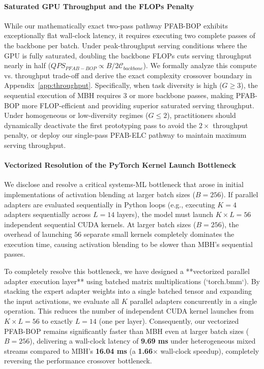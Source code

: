 \paragraph{Saturated GPU Throughput and the FLOPs Penalty}
While our mathematically exact two-pass pathway \textsc{PFAB-BOP} exhibits exceptionally flat wall-clock latency, it requires executing two complete passes of the backbone per batch. Under peak-throughput serving conditions where the GPU is fully saturated, doubling the backbone FLOPs cuts serving throughput nearly in half ($QPS_{PFAB-BOP} \propto B / 2\mathcal{C}_{backbone}$). We formally analyze this compute vs. throughput trade-off and derive the exact complexity crossover boundary in Appendix~\ref{app:throughput}. Specifically, when task diversity is high ($G \ge 3$), the sequential execution of \textsc{MBH} requires 3 or more backbone passes, making \textsc{PFAB-BOP} more FLOP-efficient and providing superior saturated serving throughput. Under homogeneous or low-diversity regimes ($G \le 2$), practitioners should dynamically deactivate the first prototyping pass to avoid the $2\times$ throughput penalty, or deploy our single-pass \textsc{PFAB-ELC} pathway to maintain maximum serving throughput.

\paragraph{Vectorized Resolution of the PyTorch Kernel Launch Bottleneck}
We disclose and resolve a critical systems-ML bottleneck that arose in initial implementations of activation blending at larger batch sizes ($B=256$). If parallel adapters are evaluated sequentially in Python loops (e.g., executing $K=4$ adapters sequentially across $L=14$ layers), the model must launch $K \times L = 56$ independent sequential CUDA kernels. At larger batch sizes ($B=256$), the overhead of launching $56$ separate small kernels completely dominates the execution time, causing activation blending to be slower than MBH's sequential passes.

To completely resolve this bottleneck, we have designed a **vectorized parallel adapter execution layer** using batched matrix multiplications (`torch.bmm`). By stacking the expert adapter weights into a single batched tensor and expanding the input activations, we evaluate all $K$ parallel adapters concurrently in a single operation. This reduces the number of independent CUDA kernel launches from $K \times L = 56$ to exactly $L = 14$ (one per layer). Consequently, our vectorized \textsc{PFAB-BOP} remains significantly faster than MBH even at larger batch sizes ($B=256$), delivering a wall-clock latency of \textbf{9.69 ms} under heterogeneous mixed streams compared to MBH's \textbf{16.04 ms} (a \textbf{1.66$\times$} wall-clock speedup), completely reversing the performance crossover bottleneck.

